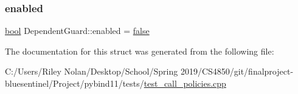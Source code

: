 \subsubsection{\texorpdfstring{enabled}{enabled}}
{\footnotesize\ttfamily \mbox{\hyperlink{asdl_8h_af6a258d8f3ee5206d682d799316314b1}{bool}} Dependent\+Guard\+::enabled = \mbox{\hyperlink{asdl_8h_af6a258d8f3ee5206d682d799316314b1ae9de385ef6fe9bf3360d1038396b884c}{false}}\hspace{0.3cm}{\ttfamily [static]}}



The documentation for this struct was generated from the following file\+:\begin{DoxyCompactItemize}
\item 
C\+:/\+Users/\+Riley Nolan/\+Desktop/\+School/\+Spring 2019/\+C\+S4850/git/finalproject-\/bluesentinel/\+Project/pybind11/tests/\mbox{\hyperlink{test__call__policies_8cpp}{test\+\_\+call\+\_\+policies.\+cpp}}\end{DoxyCompactItemize}
